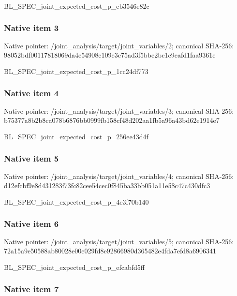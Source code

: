 \documentclass[10pt,a4paper]{article}
\begin{document}
BL\_SPEC\_joint\_expected\_c\allowbreak{}ost\_p\_eb3546e82c


\subsubsection{Native item 3}


Native pointer: /joint\_analysis/target/j\allowbreak{}oint\_variables/2; canonical SHA-256: 98052bdf00117818069da4e5\allowbreak{}4908c109e3c75ad3f5bbe2bc\allowbreak{}1c9eafd1faa9361e


BL\_SPEC\_joint\_expected\_c\allowbreak{}ost\_p\_1cc24df773


\subsubsection{Native item 4}


Native pointer: /joint\_analysis/target/j\allowbreak{}oint\_variables/3; canonical SHA-256: b75377a8b2b8ca078b6876bb\allowbreak{}0999fb158cf48d202aa1fb5a\allowbreak{}96a43bd62e1914e7


BL\_SPEC\_joint\_expected\_c\allowbreak{}ost\_p\_256ee43d4f


\subsubsection{Native item 5}


Native pointer: /joint\_analysis/target/j\allowbreak{}oint\_variables/4; canonical SHA-256: d12efcbf9e8d431283f73fc8\allowbreak{}2cee54cec0f845ba33bb051a\allowbreak{}11e58c47c430dfc3


BL\_SPEC\_joint\_expected\_c\allowbreak{}ost\_p\_4e3f70b140


\subsubsection{Native item 6}


Native pointer: /joint\_analysis/target/j\allowbreak{}oint\_variables/5; canonical SHA-256: 72a15a9e50588ab80028e00e\allowbreak{}029fd8e92866980d365482e4\allowbreak{}fda7efd8a6906341


BL\_SPEC\_joint\_expected\_c\allowbreak{}ost\_p\_efcabfd5ff


\subsubsection{Native item 7}
\end{document}
